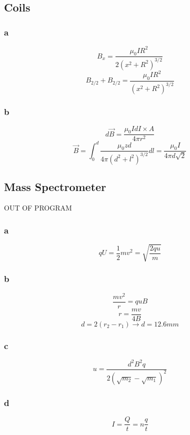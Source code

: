 \subsection{Coils}

\subsubsection{a}
\[
	B_x = \frac{\mu_0 I R^2}{2 (x^2 + R^2)^{3/2}}
\]
\[
	B_{2/2} + B_{2/2} = \frac{\mu_0 I R^2}{(x^2 + R^2)^{3/2}}
\]
\subsubsection{b}
\[
	d \vec{B} = \frac{\mu_0 I d I \times A}{4 \pi r^2}
\]
\[
	\vec{B} = \int_0^d \frac{\mu_0 z d}{4 \pi (d^2 + l^2)^{3/2}} dl
	= \frac{\mu_0 I}{4 \pi d \sqrt{2}}
\]

\subsection{Mass Spectrometer}
OUT OF PROGRAM

\subsubsection{a}
\[
	q U = \frac{1}{2} m v^2 = \sqrt{\frac{2qu}{m}}
\]

\subsubsection{b}
\[\frac{m v^2}{r} = q u B\]
\[r = \frac{m v}{4 B}\]
\[d = 2(r_2 - r_1) \to d = 12.6 \unit{mm}\]

\subsubsection{c}
\[u = \frac{d^2 B^2 q}{2(\sqrt{m_2} - \sqrt{m_1})^2}\]

\subsubsection{d}
\[I = \frac{Q}{t} = n \frac{q}{t}\]
